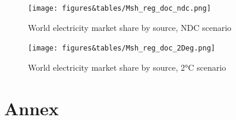 \begin{figure}[H]
    \centerline{\texttt{[image: figures\&tables/Msh\_reg\_doc\_ndc.png]}}
    \caption{World electricity market share by source, NDC scenario}
    \label{fig:Msh_reg_ndc}
\end{figure}

\begin{figure}[H]
    \centerline{\texttt{[image: figures\&tables/Msh\_reg\_doc\_2Deg.png]}}
    \caption{World electricity market share by source, 2°C scenario}
    \label{fig:Msh_reg_2deg}
\end{figure}


    




\newpage
\section{Annex}


